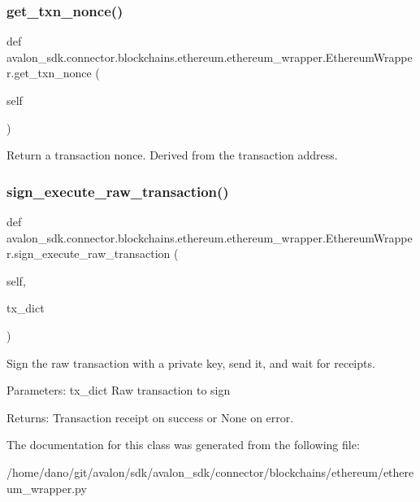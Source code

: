 \subsubsection{\texorpdfstring{get\+\_\+txn\+\_\+nonce()}{get\_txn\_nonce()}}
{\footnotesize\ttfamily def avalon\+\_\+sdk.\+connector.\+blockchains.\+ethereum.\+ethereum\+\_\+wrapper.\+Ethereum\+Wrapper.\+get\+\_\+txn\+\_\+nonce (\begin{DoxyParamCaption}\item[{}]{self }\end{DoxyParamCaption})}

\begin{DoxyVerb}Return a transaction nonce. Derived from the transaction address.
\end{DoxyVerb}
 \mbox{\label{classavalon__sdk_1_1connector_1_1blockchains_1_1ethereum_1_1ethereum__wrapper_1_1EthereumWrapper_a62b23762d0a6b344ca01327d37c9f8bf}} 
\subsubsection{\texorpdfstring{sign\+\_\+execute\+\_\+raw\+\_\+transaction()}{sign\_execute\_raw\_transaction()}}
{\footnotesize\ttfamily def avalon\+\_\+sdk.\+connector.\+blockchains.\+ethereum.\+ethereum\+\_\+wrapper.\+Ethereum\+Wrapper.\+sign\+\_\+execute\+\_\+raw\+\_\+transaction (\begin{DoxyParamCaption}\item[{}]{self,  }\item[{}]{tx\+\_\+dict }\end{DoxyParamCaption})}

\begin{DoxyVerb}Sign the raw transaction with a private key, send it,
and wait for receipts.

Parameters:
tx_dict     Raw transaction to sign


Returns:
Transaction receipt on success or None on error.
\end{DoxyVerb}
 

The documentation for this class was generated from the following file\+:\begin{DoxyCompactItemize}
\item 
/home/dano/git/avalon/sdk/avalon\+\_\+sdk/connector/blockchains/ethereum/ethereum\+\_\+wrapper.\+py\end{DoxyCompactItemize}
